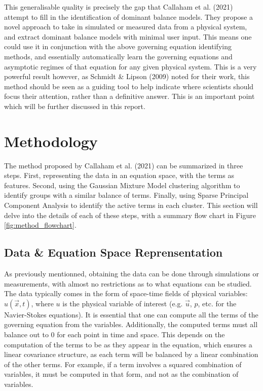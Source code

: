 \documentclass[12pt]{report} %
\begin{document}
\vspace{5mm}

This generalisable quality is precisely the gap that Callaham et al. (2021)\cite{callaham2021learning} attempt to fill in the identification of dominant balance models. They propose a novel approach to take in simulated or measured data from a physical system, and extract dominant balance models with minimal user input. This means one could use it in conjunction with the above governing equation identifying methods, and essentially automatically learn the governing equations and asymptotic regimes of that equation for any given physical system. This is a very powerful result however, as Schmidt \& Lipson (2009) noted for their work, this method should be seen as a guiding tool to help indicate where scientists should focus their attention, rather than a definitive answer. This is an important point which will be further discussed in this report.


\chapter{Methodology}

The method proposed by Callaham et al. (2021)\cite{callaham2021learning} can be summarized in three steps. First, representing the data in an equation space, with the terms as features. Second, using the Gaussian Mixture Model clustering algorithm to identify groups with a similar balance of terms. Finally, using Sparse Principal Component Analysis to identify the active terms in each cluster. This section will delve into the details of each of these steps, with a summary flow chart in Figure \ref{fig:method_flowchart}.

\section{Data \& Equation Space Reprensentation}

As previously mentionned, obtaining the data can be done through simulations or measurements, with almost no restrictions as to what equations can be studied. The data typically comes in the form of space-time fields of physical variables: $u(\vec{x}, t)$, where $u$ is the physical variable of interest (e.g. $\vec{u}$, $p$, etc. for the Navier-Stokes equations). It is essential that one can compute all the terms of the governing equation from the variables. Additionally, the computed terms must all balance out to 0 for each point in time and space. This depends on the computation of the terms to be as they appear in the equation, which ensures a linear covariance structure, as each term will be balanced by a linear combination of the other terms\cite[Supplementary Information]{callaham2021learning}. For example, if a term involves a squared combination of variables, it must be computed in that form, and not as the combination of variables.
\end{document}
